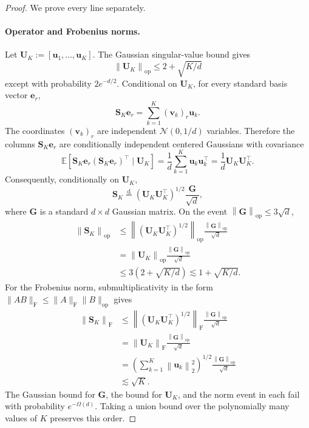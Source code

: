 \documentclass[11pt]{article}
\theoremstyle{definition}
\newcommand{\ub}{\mathbf{u}}
\newcommand{\vb}{\mathbf{v}}
\newcommand{\Gb}{\mathbf{G}}
\newcommand{\Sb}{\mathbf{S}}
\newcommand{\Ub}{\mathbf{U}}
\newcommand{\EE}{\mathbb{E}}
\newcommand{\norm}[1]{\left\lVert #1\right\rVert_2}
\newcommand{\normF}[1]{\left\lVert #1\right\rVert_{\mathrm F}}
\newcommand{\normop}[1]{\left\lVert #1\right\rVert_{\mathrm{op}}}
\begin{document}
\begin{proof}
We prove every line separately.

\paragraph{Operator and Frobenius norms.}
Let $\Ub_K:=[\ub_1,\ldots,\ub_K]$.  The Gaussian singular-value bound gives
\[
 \normop{\Ub_K}\leq2+\sqrt{K/d}
\]
except with probability $2e^{-d/2}$.  Conditional on $\Ub_K$, for every
standard basis vector $\mathbf e_r$,
\[
 \Sb_K\mathbf e_r
 =\sum_{k=1}^K(\vb_k)_r\ub_k.
\]
The coordinates $(\vb_k)_r$ are independent
$\mathcal N(0,1/d)$ variables.  Therefore the columns
$\Sb_K\mathbf e_r$ are conditionally independent centered Gaussians with
covariance
\[
 \EE[\Sb_K\mathbf e_r(\Sb_K\mathbf e_r)^\top\mid\Ub_K]
 =\frac1d\sum_{k=1}^K\ub_k\ub_k^\top
 =\frac1d\Ub_K\Ub_K^\top.
\]
Consequently, conditionally on $\Ub_K$,
\[
 \Sb_K\overset{\mathrm d}=
 (\Ub_K\Ub_K^\top)^{1/2}\frac{\Gb}{\sqrt d},
\]
where $\Gb$ is a standard $d\times d$ Gaussian matrix.  On the event
$\normop{\Gb}\leq3\sqrt d$,
\begin{align*}
 \normop{\Sb_K}
 &\leq
 \normop{(\Ub_K\Ub_K^\top)^{1/2}}
 \frac{\normop{\Gb}}{\sqrt d}\\
 &=\normop{\Ub_K}\frac{\normop{\Gb}}{\sqrt d}\\
 &\leq3(2+\sqrt{K/d})
 \lesssim1+\sqrt{K/d}.
\end{align*}
For the Frobenius norm, submultiplicativity in the form
$\|AB\|_{\mathrm F}\leq\|A\|_{\mathrm F}\|B\|_{\mathrm{op}}$ gives
\begin{align*}
 \normF{\Sb_K}
 &\leq
 \normF{(\Ub_K\Ub_K^\top)^{1/2}}
 \frac{\normop{\Gb}}{\sqrt d}\\
 &=\normF{\Ub_K}\frac{\normop{\Gb}}{\sqrt d}\\
 &=\left(\sum_{k=1}^K\norm{\ub_k}^2\right)^{1/2}
 \frac{\normop{\Gb}}{\sqrt d}\\
 &\lesssim\sqrt K.
\end{align*}
The Gaussian bound for $\Gb$, the bound for $\Ub_K$, and the norm event in
 each fail with probability $e^{-\Omega(d)}$.
Taking a union bound over the polynomially many values of $K$ preserves this
order.


\end{proof}
\end{document}
